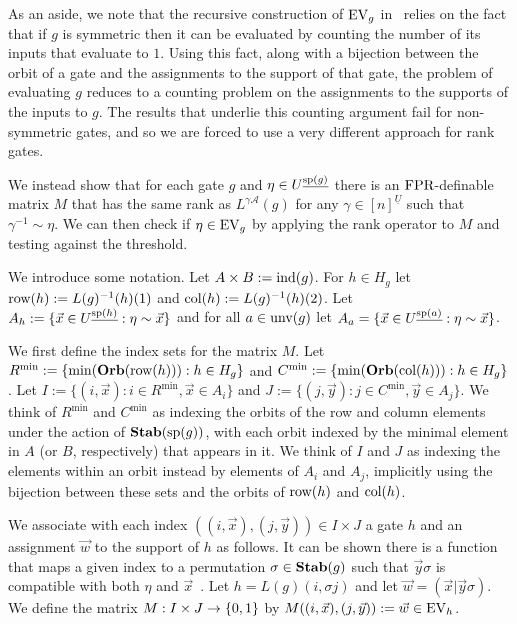 \documentclass[a4paper,UKenglish]{lipics-v2018}
\begin{document}
As an aside, we note that the recursive construction of $\text{EV}_g$
in~\cite{AndersonD17} relies on the fact that if $g$ is symmetric then it can be
evaluated by counting the number of its inputs that evaluate to $1$. Using this
fact, along with a bijection between the orbit of a gate and the assignments to
the support of that gate, the problem of evaluating $g$ reduces to a counting
problem on the assignments to the supports of the inputs to $g$. The results
that underlie this counting argument fail for non-symmetric gates, and so we are
forced to use a very different approach for rank gates.

We instead show that for each gate $g$ and $\eta \in U^{\underline{\text{sp}(g)}}$
there is an $\text{\upshape FPR}$-definable matrix $M$ that has the same rank as $L^{\gamma
  \mathcal{A}}(g)$ for any $\gamma \in [n]^{\underline{U}}$ such that
$\gamma^{-1} \sim \eta$. We can then check if $\eta \in \text{EV}_g$ by applying the
rank operator to $M$ and testing against the threshold.

We introduce some notation. Let $A \times B := \text{\upshape ind}(g)$. For $h \in H_g$ let
$\text{row}(h) := L(g)^{-1}(h)(1)$ and $\text{col}(h) := L(g)^{-1}(h)(2)$. Let $A_h := \{
\vec{x} \in U^{\underline{\text{sp}(h)}} : \eta \sim \vec{x} \}$ and for all $a \in
\text{unv}(g)$ let $A_a = \{\vec{x} \in U^{\underline{\text{sp}(a)}} : \eta \sim
\vec{x}\}$.

We first define the index sets for the matrix $M$. Let $R^{\min} := \{\min
(\text{\textbf{Orb}}(\text{row}(h))) : h \in H_g\}$ and $C^{\min} := \{ \min (\text{\textbf{Orb}} (\text{col}(h))) : h
\in H_g\}$. Let $I := \{(i, \vec{x}): i \in R^{\min}, \vec{x} \in A_i\}$ and $J
:= \{(j, \vec{y}): j \in C^{\min}, \vec{y} \in A_j\}$. We think of $R^{\min}$
and $C^{\min}$ as indexing the orbits of the row and column elements under the
action of $\text{\textbf{Stab}}(\text{sp}(g))$, with each orbit indexed by the minimal element in
$A$ (or $B$, respectively) that appears in it. We think of $I$ and $J$ as
indexing the elements within an orbit instead by elements of $A_i$ and $A_j$,
implicitly using the bijection between these sets and the orbits of $\text{row}(h)$
and $\text{col}(h)$.

We associate with each index $((i, \vec{x}), (j, \vec{y})) \in I \times J$ a
gate $h$ and an assignment $\vec{w}$ to the support of $h$ as follows. It can be
shown there is a function that maps a given index to a permutation $\sigma \in
\text{\textbf{Stab}}(g)$ such that $\vec{y} \sigma$ is compatible with both $\eta$ and
$\vec{x}$~\cite{DW-arxiv}. Let $h = L(g)(i, \sigma j)$ and let $\vec{w} =
(\vec{x} \vert \vec{y} \sigma)$. We define the matrix $M : I \times J \rightarrow
\{0,1\}$ by $M((i , \vec{x}), (j, \vec{y})) := \vec{w} \in \text{EV}_h$.
\end{document}
